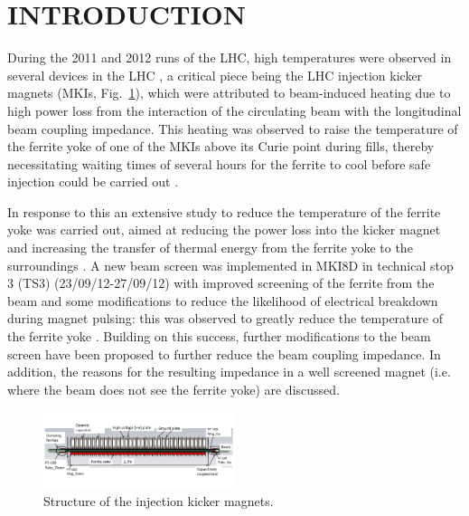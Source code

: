 \documentclass{JAC2003}
\begin{document}
% 

\section{INTRODUCTION}

During the 2011 and 2012 runs of the LHC, high temperatures were observed in several devices in the LHC  \cite{metral_cham2012}, a critical piece being the LHC injection kicker magnets (MKIs, Fig.~\ref{fig:mkiStruct}), which were attributed to beam-induced heating due to high power loss from the interaction of the circulating beam with the longitudinal beam coupling impedance. This heating was observed to raise the temperature of the ferrite yoke of one of the MKIs above its Curie point during fills, thereby necessitating waiting times of several hours for the ferrite to cool before safe injection could be carried out \cite{mki-heating}. 

In response to this an extensive study to reduce the temperature of the ferrite yoke was carried out, aimed at reducing the power loss into the kicker magnet and increasing the transfer of thermal energy from the ferrite yoke to the surroundings \cite{mki-heatingTemp}. A new beam screen was implemented in MKI8D in technical stop 3 (TS3) (23/09/12-27/09/12) with improved screening of the ferrite from the beam and some modifications to reduce the likelihood of electrical breakdown during magnet pulsing: this was observed to greatly reduce the temperature of the ferrite yoke \cite{mki-heatingTemp}. Building on this success, further modifications to the beam screen have been proposed to further reduce the beam coupling impedance. In addition, the reasons for the resulting impedance in a well screened magnet (i.e. where the beam does not see the ferrite yoke) are discussed. 

\begin{figure}
\includegraphics[width=0.5\textwidth]{TUPME033f1.pdf}
\caption{Structure of the injection kicker magnets.}
\label{fig:mkiStruct}
\end{figure}
\end{document}
